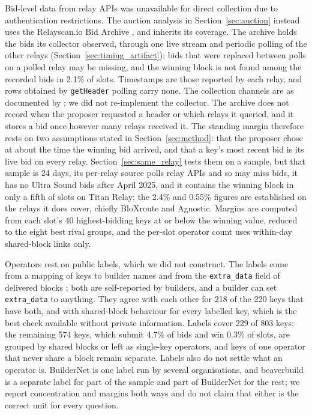 \documentclass[11pt]{article}
\begin{document}
Bid-level data from relay APIs was unavailable for direct collection due to
authentication restrictions. The auction analysis in Section~\ref{sec:auction}
instead uses the Relayscan.io Bid Archive \citep{relayscan2024}, and inherits
its coverage. The archive holds the bids its collector observed, through one
live stream and periodic polling of the other relays
(Section~\ref{sec:timing_artifact}); bids that were replaced between polls on
a polled relay may be missing, and the winning block is not found among the
recorded bids in 2.1\% of slots. Timestamps are those reported by each
relay, and rows obtained by \texttt{getHeader} polling carry none. The
collection channels are as documented by \citet{relayscan2024}; we did not
re-implement the collector. The archive does not record when the proposer
requested a header or which relays it queried, and it stores a bid once
however many relays received it. The standing margin therefore rests on two
assumptions stated in Section~\ref{sec:method}: that the proposer chose at
about the time the winning bid arrived, and that a key's most recent bid is
its live bid on every relay. Section~\ref{sec:same_relay} tests them on a
sample, but that sample is 24 days, its per-relay source polls relay APIs
and so may miss bids, it has no Ultra Sound bids after April 2025, and it
contains the winning block in only a fifth of slots on Titan Relay; the
2.4\% and 0.55\% figures are established on the relays it does cover, chiefly
BloXroute and Agnostic. Margins are computed from each slot's 40 highest-bidding keys
at or below the winning value, reduced to the eight best rival groups, and
the per-slot operator count uses within-day shared-block links only.

Operators rest on public labels, which we did not construct. The labels
come from a mapping of keys to builder names and from the
\texttt{extra\_data} field of delivered blocks \citep{dataalways2024}; both
are self-reported by builders, and a builder can set \texttt{extra\_data}
to anything. They agree with each other for 218 of the 220 keys that have
both, and with shared-block behaviour for every labelled key, which is the
best check available without private information. Labels cover 229 of 803
keys; the remaining 574 keys, which submit 4.7\% of bids and win 0.3\% of
slots, are grouped by shared blocks or left as single-key operators, and
keys of one operator that never share a block remain separate. Labels also
do not settle what an operator is. BuilderNet is one label run by several
organisations, and beaverbuild is a separate label for part of the sample
and part of BuilderNet for the rest; we report concentration and margins
both ways and do not claim that either is the correct unit for every
question.
\end{document}

